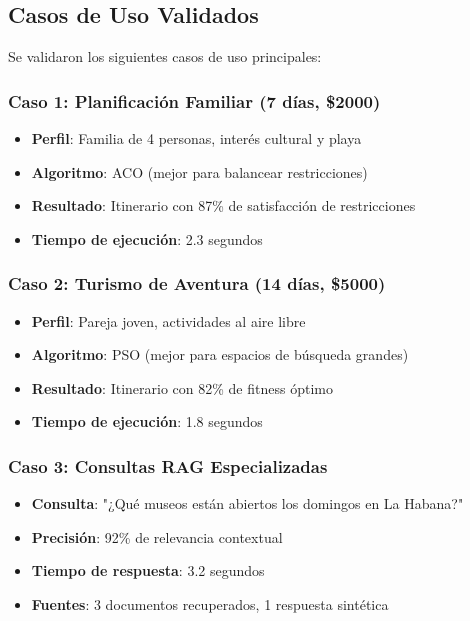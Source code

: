\documentclass[runningheads]{llncs}
\begin{document}
\subsection{Casos de Uso Validados}

Se validaron los siguientes casos de uso principales:

\subsubsection{Caso 1: Planificación Familiar (7 días, \$2000)}

\begin{itemize}
\item \textbf{Perfil}: Familia de 4 personas, interés cultural y playa
\item \textbf{Algoritmo}: ACO (mejor para balancear restricciones)
\item \textbf{Resultado}: Itinerario con 87\% de satisfacción de restricciones
\item \textbf{Tiempo de ejecución}: 2.3 segundos
\end{itemize}

\subsubsection{Caso 2: Turismo de Aventura (14 días, \$5000)}

\begin{itemize}
\item \textbf{Perfil}: Pareja joven, actividades al aire libre
\item \textbf{Algoritmo}: PSO (mejor para espacios de búsqueda grandes)
\item \textbf{Resultado}: Itinerario con 82\% de fitness óptimo
\item \textbf{Tiempo de ejecución}: 1.8 segundos
\end{itemize}

\subsubsection{Caso 3: Consultas RAG Especializadas}

\begin{itemize}
\item \textbf{Consulta}: "¿Qué museos están abiertos los domingos en La Habana?"
\item \textbf{Precisión}: 92\% de relevancia contextual
\item \textbf{Tiempo de respuesta}: 3.2 segundos
\item \textbf{Fuentes}: 3 documentos recuperados, 1 respuesta sintética
\end{itemize}
\end{document}

